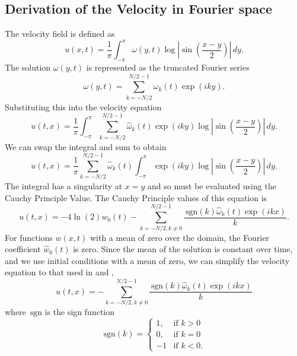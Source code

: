 \documentclass[12pt]{article}
\def\w{\omega}
\def\wk{\hat{\omega}_k}
\def\sgn{\,\text{sgn}}
\numberwithin{equation}{section}
\begin{document}
\subsection{Derivation of the Velocity in Fourier space}

The velocity field is defined as
$$u(x,t) = \frac{1}{\pi}\int_{-\pi}^{\pi}\w(y,t)\log\left| \sin\left(\frac{x-y}{2}\right) \right|\,dy.$$
The solution $\w(y,t)$ is represented as the truncated Fourier series
$$\w(y,t) = \sum_{k=-N/2}^{N/2 - 1}\w_k(t)\exp(iky).$$
Substituting this into the velocity equation
$$u(t,x) = \frac{1}{\pi}\int_{-\pi}^{\pi} \sum_{k=-N/2}^{N/2 - 1}\wk(t)\exp(iky)\log\left| \sin\left(\frac{x-y}{2}\right) \right|\,dy.$$
We can swap the integral and sum to obtain
$$u(t,x) = \frac{1}{\pi} \sum_{k=-N/2}^{N/2 - 1}\wk(t) \int_{-\pi}^{\pi}\exp(iky)\log\left| \sin\left(\frac{x-y}{2}\right) \right|\,dy.$$
The integral has a singularity at $x=y$ and so must be evaluated using the Cauchy Principle Value. The Cauchy Principle values of this equation is
$$u(t,x) = -4\ln(2)w_0(t) - \sum_{k=-N/2,k\neq 0}^{N/2 - 1}\frac{\sgn(k)\wk(t) \exp(ikx)}{k}.$$
For functions $w(x,t)$ with a mean of zero over the domain, the Fourier coefficient $\hat{w}_0(t)$ is zero. Since the mean of the solution is constant over time, and we use initial conditions with a mean of zero, we can simplify the velocity equation to that used in \cite{hideki_numerical_2006} and \cite{okamoto_generalization_2008},
$$u(t,x) = -\sum_{k=-N/2,k\neq 0}^{N/2 - 1}\frac{\sgn(k)\wk(t) \exp(ikx)}{k}$$
where $\sgn$ is the sign function 
$$\sgn(k) = \begin{cases}
  1, & \text{if } k > 0 \\
  0, & \text{if } k = 0 \\
  -1 & \text{if } k < 0.
\end{cases}$$



\raggedright

\end{document}
